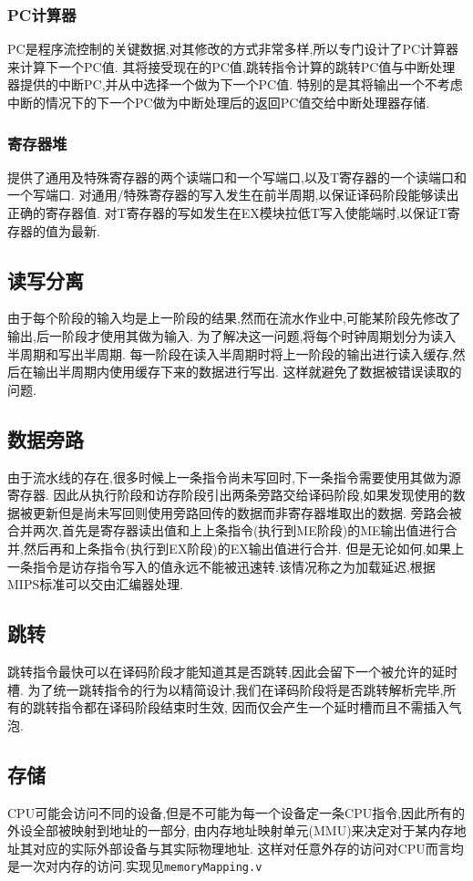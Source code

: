   \subsubsection{PC计算器}
    PC是程序流控制的关键数据,对其修改的方式非常多样,所以专门设计了PC计算器来计算下一个PC值.
    其将接受现在的PC值,跳转指令计算的跳转PC值与中断处理器提供的中断PC,并从中选择一个做为下一个PC值.
    特别的是其将输出一个不考虑中断的情况下的下一个PC做为中断处理后的返回PC值交给中断处理器存储.
  \subsubsection{寄存器堆}
    提供了通用及特殊寄存器的两个读端口和一个写端口,以及T寄存器的一个读端口和一个写端口.
    对通用/特殊寄存器的写入发生在前半周期,以保证译码阶段能够读出正确的寄存器值.
    对T寄存器的写如发生在EX模块拉低T写入使能端时,以保证T寄存器的值为最新.

\subsection{读写分离}
由于每个阶段的输入均是上一阶段的结果,然而在流水作业中,可能某阶段先修改了输出,后一阶段才使用其做为输入.
为了解决这一问题,将每个时钟周期划分为读入半周期和写出半周期.
每一阶段在读入半周期时将上一阶段的输出进行读入缓存,然后在输出半周期内使用缓存下来的数据进行写出.
这样就避免了数据被错误读取的问题.
\subsection{数据旁路}
由于流水线的存在,很多时候上一条指令尚未写回时,下一条指令需要使用其做为源寄存器.
因此从执行阶段和访存阶段引出两条旁路交给译码阶段,如果发现使用的数据被更新但是尚未写回则使用旁路回传的数据而非寄存器堆取出的数据.
旁路会被合并两次,首先是寄存器读出值和上上条指令(执行到ME阶段)的ME输出值进行合并,然后再和上条指令(执行到EX阶段)的EX输出值进行合并.
但是无论如何,如果上一条指令是访存指令写入的值永远不能被迅速转.该情况称之为加载延迟,根据MIPS标准可以交由汇编器处理.
\subsection{跳转}
跳转指令最快可以在译码阶段才能知道其是否跳转,因此会留下一个被允许的延时槽.
为了统一跳转指令的行为以精简设计,我们在译码阶段将是否跳转解析完毕,所有的跳转指令都在译码阶段结束时生效,
因而仅会产生一个延时槽而且不需插入气泡.
\subsection{存储}
CPU可能会访问不同的设备,但是不可能为每一个设备定一条CPU指令,因此所有的外设全部被映射到地址的一部分,
由内存地址映射单元(MMU)来决定对于某内存地址其对应的实际外部设备与其实际物理地址.
这样对任意外存的访问对CPU而言均是一次对内存的访问.实现见\verb|memoryMapping.v|

